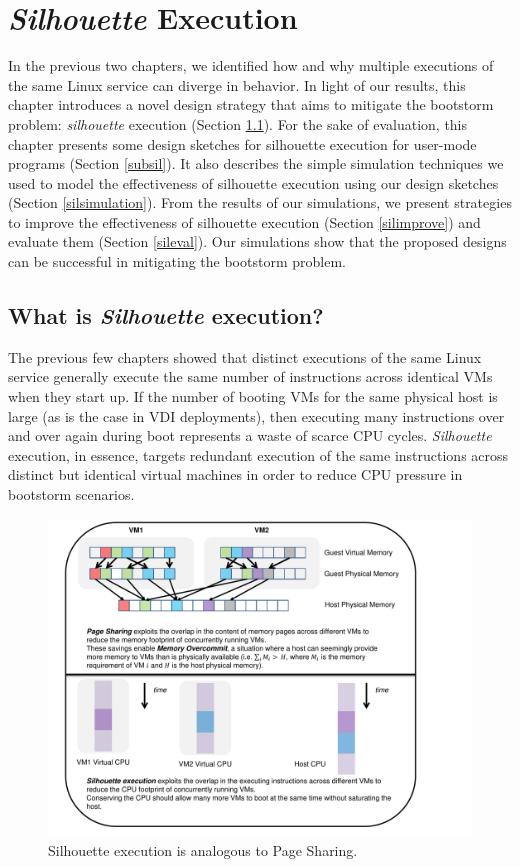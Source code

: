 \chapter{{\em Silhouette} Execution} \label{ch:sil}
In the previous two chapters,
we identified how and why
multiple executions of the same
Linux service can diverge in behavior.
In light of our results, this chapter introduces a 
novel design strategy that aims to mitigate the bootstorm problem:
{\em silhouette} execution (Section \ref{def:sil}).
For the sake of evaluation, this chapter
presents some design sketches for silhouette
execution for user-mode programs (Section \ref{subsil}).
It also describes the simple simulation techniques we used 
to model the effectiveness of silhouette
execution using our design sketches
(Section \ref{silsimulation}).
From the results of our simulations, we present strategies
to improve the effectiveness of
silhouette execution (Section \ref{silimprove})
and evaluate them (Section \ref{sileval}).
Our simulations show that the proposed designs can be successful
in mitigating the bootstorm problem. 

\section{What is {\em Silhouette} execution?} \label{def:sil}
The previous few chapters showed that
distinct executions of the same Linux service
generally execute the same number of instructions
across identical VMs when they start up. If the number of booting VMs for
the same physical host is large (as is 
the case in VDI deployments),
then executing many instructions over
and over again during boot represents a waste of scarce CPU cycles.
{\em Silhouette} execution, in essence, targets
redundant execution of the same instructions across distinct but
identical virtual machines in order to reduce CPU pressure in bootstorm
scenarios. 

\newpage
\begin{figure} []
  \centering
  \includegraphics[scale=0.8, trim=2cm 0cm -5cm 0cm]{overcommit.pdf}
  \caption[Silhouette execution is analogous to Page Sharing.]%
          {Silhouette execution is analogous to Page Sharing.}

  \label{silconcept}
\end{figure}

